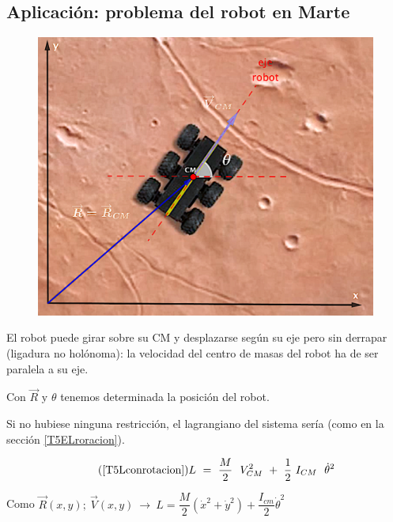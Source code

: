 \vspace{1cm}
\subsection{Aplicación: problema del robot en Marte}
\label{T4SecELF}
\vspace{0.5cm}

\begin{example}

\begin{multicols}{2}
\begin{figure}[H]
		\centering
		\includegraphics[width=.45\textwidth]{imagenes/img09-02.png}
	\end{figure}	
	
	El robot puede girar sobre su CM y desplazarse según su eje pero sin derrapar (ligadura no holónoma): la velocidad del centro de masas del robot ha de ser paralela a su eje.

\vspace{2mm} Con $\overrightarrow R \text{ y } \theta$ tenemos determinada la posición del robot. 

\vspace{2mm} Si no hubiese ninguna restricción, el lagrangiano del sistema sería (como en la sección \ref{T5ELroracion}).

\begin{equation}
\tag{\ref{T5Lconrotacion}}
L \ = \ \dfrac{M}{2}\ \ V_{CM}^2 \ + \ \dfrac 1 2 \ I_{CM}\  \ \dot \theta^2	
\end{equation}
\end{multicols}

\vspace{2mm} Como $\overrightarrow R(x,y);\ \overrightarrow V(x,y) \ \to \ L=\dfrac M 2 (\dot x^2 + \dot y^2)+\dfrac{I_{cm}}{2} \dot \theta^2$



\end{example}

